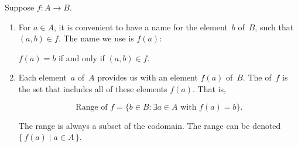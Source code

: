 \begin{notation}\label{FunctionNotation} 
 Suppose $f \colon A \to B$. 
\begin{enumerate}
\item For $a \in A$, it is convenient to have a name for the element~$b$ of~$B$, such that $(a,b) \in f$. The name we use is $f(a)$:
\begin{center}
$f(a) = b$ if and only if $(a,b) \in f$.
\end{center}
\item \label{FunctionNotation-range}
 Each element~$a$ of~$A$ provides us with an element $f(a)$ of~$B$. The  of~$f$ is the set that includes all of these elements $f(a)$. That is,

\[ \mbox{Range of }f = \{b \in B : \exists a \in A \mbox{ with } f(a)=b\}.\]

The range is always a subset of the codomain. The range can be denoted $\{\, f(a) \mid a \in A \, \}$.
\end{enumerate}
\end{notation}

